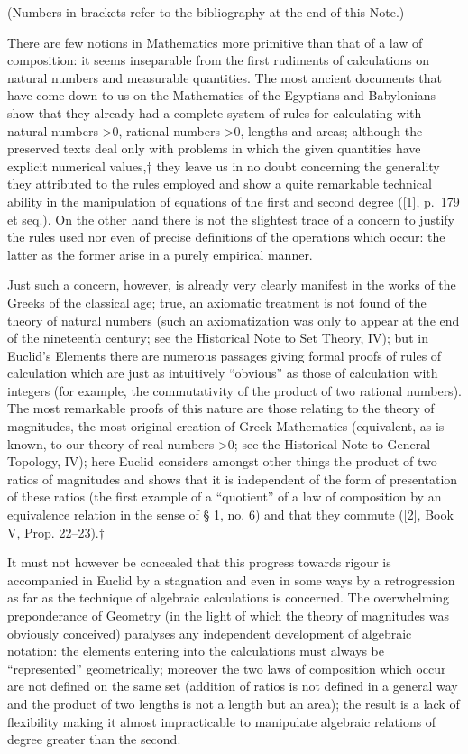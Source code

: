 
(Numbers in brackets refer to the bibliography at the end of this Note.)

There are few notions in Mathematics more primitive than that of a law of composition: it seems inseparable from the first rudiments of calculations on natural numbers and measurable quantities. The most ancient documents that have come down to us on the Mathematics of the Egyptians and Babylonians show that they already had a complete system of rules for calculating with natural numbers \textgreater0, rational numbers \textgreater0, lengths and areas; although the preserved texts deal only with problems in which the given quantities have explicit numerical values,† they leave us in no doubt concerning the generality they attributed to the rules employed and show a quite remarkable technical ability in the manipulation of equations of the first and second degree ({[}1{]}, p.~179 et seq.). On the other hand there is not the slightest trace of a concern to justify the rules used nor even of precise definitions of the operations which occur: the latter as the former arise in a purely empirical manner.

Just such a concern, however, is already very clearly manifest in the works of the Greeks of the classical age; true, an axiomatic treatment is not found of the theory of natural numbers (such an axiomatization was only to appear at the end of the nineteenth century; see the Historical Note to Set Theory, IV); but in Euclid's Elements there are numerous passages giving formal proofs of rules of calculation which are just as intuitively ``obvious'' as those of calculation with integers (for example, the commutativity of the product of two rational numbers). The most remarkable proofs of this nature are those relating to the theory of magnitudes, the most original creation of Greek Mathematics (equivalent, as is known, to our theory of real numbers \textgreater0; see the Historical Note to General Topology, IV); here Euclid considers amongst other things the product of two ratios of magnitudes and shows that it is independent of the form of presentation of these ratios (the first example of a ``quotient'' of a law of composition by an equivalence relation in the sense of § 1, no. 6) and that they commute ({[}2{]}, Book V, Prop. 22--23).†

It must not however be concealed that this progress towards rigour is accompanied in Euclid by a stagnation and even in some ways by a retrogression as far as the technique of algebraic calculations is concerned. The overwhelming preponderance of Geometry (in the light of which the theory of magnitudes was obviously conceived) paralyses any independent development of algebraic notation: the elements entering into the calculations must always be ``represented'' geometrically; moreover the two laws of composition which occur are not defined on the same set (addition of ratios is not defined in a general way and the product of two lengths is not a length but an area); the result is a lack of flexibility making it almost impracticable to manipulate algebraic relations of degree greater than the second.

